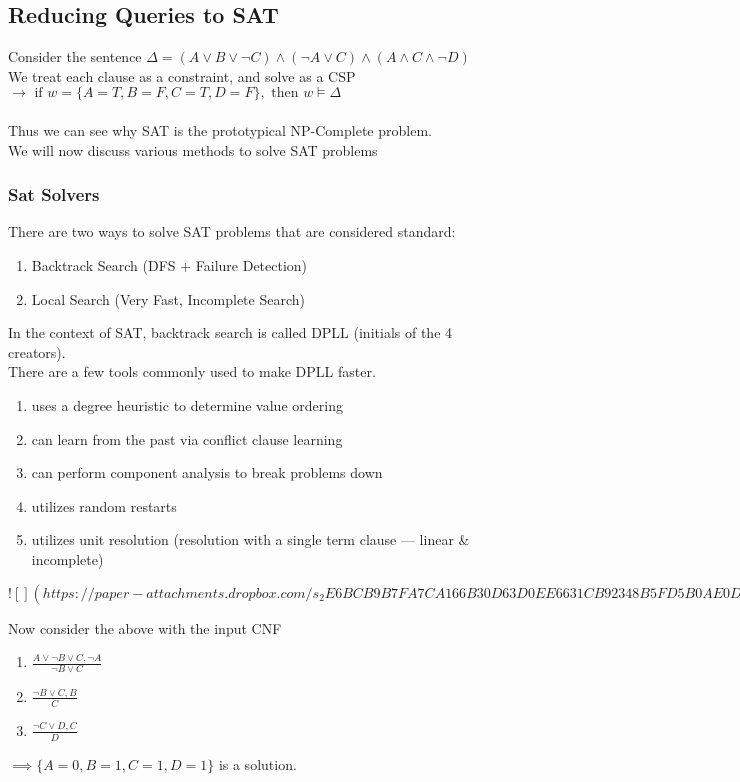 \documentclass[../../lecture_notes.tex]{subfiles}
\begin{document}
\subsection*{Reducing Queries to SAT}
\noindent Consider the sentence $\Delta = (A \lor B \lor \neg C) \land (\neg A \lor C) \land (A \land C \land \neg D)$\\
We treat each clause as a constraint, and solve as a CSP\\
\indent $\rightarrow \text{ if } w = \{A=T, B=F, C=T, D=F\}, \text{ then } w \models \Delta$\\
\\
Thus we can see why SAT is the prototypical NP-Complete problem.\\
We will now discuss various methods to solve SAT problems\\
 
\subsubsection*{Sat Solvers}
\noindent There are two ways to solve SAT problems that are considered standard:
\begin{enumerate} [itemsep=0mm]
	\item Backtrack Search (DFS + Failure Detection)
	\item Local Search (Very Fast, Incomplete Search)
 \end{enumerate}
\noindent In the context of SAT, backtrack search is called DPLL (initials of the 4 creators).\\
There are a few tools commonly used to make DPLL faster.
\begin{enumerate} [itemsep=0mm]
	\item uses a degree heuristic to determine value ordering
	\item can learn from the past via conflict clause learning
	\item can perform component analysis to break problems down
	\item utilizes random restarts 
	\item utilizes unit resolution (resolution with a single term clause — linear \& incomplete)
\end{enumerate}

\newpage
$![](https://paper-attachments.dropbox.com/s_2E6BCB9B7FA7CA166B30D63D0EE6631CB92348B5FD5B0AE0D0B6403B17C7DD96_1588409707432_Untitled+drawing+16.jpg)$
\newpage

\noindent Now consider the above with the input CNF
\begin{enumerate} [itemsep=0mm]
	\item $\frac {A \lor \neg B \lor C, \neg A} {\neg B \lor C}$
	\item $\frac {\neg B \lor C, B} {C}$
	\item $\frac{\neg C \lor D, C} {D}$
\end{enumerate}
\noindent $\implies \{A=0, B=1, C=1, D=1\}$ is a solution.\\
\end{document}
